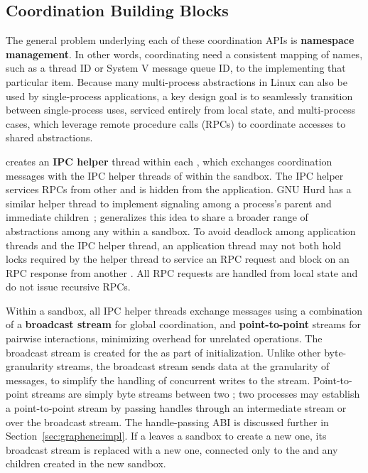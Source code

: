 \subsection{Coordination Building Blocks}
\label{sec:graphene:namespaces:blocks}

The general problem underlying each of these coordination APIs is 
{\bf namespace management}.  In other words, coordinating \picoprocs{} need 
a consistent mapping of names, such as a thread ID or System V message queue ID, 
to the \picoproc{} implementing that particular item.  
Because many multi-process abstractions in Linux can also be used by single-process applications,
a key design goal is to seamlessly transition between single-process uses, serviced 
entirely from local \libos{} state, and multi-process cases, which
leverage remote procedure calls (RPCs) to coordinate accesses to shared abstractions.


\sysname{} creates an  {\bf IPC helper} thread within each \picoproc{},
which exchanges coordination messages with the IPC helper threads of \picoprocs{} 
within the sandbox. %
The IPC helper
services RPCs from other \picoprocs{} and is
hidden from the application. 
GNU Hurd has a similar helper thread to implement signaling among a process's parent and
immediate children~\citep{hurd};
\sysname{} generalizes this idea to share a broader range of abstractions among any \picoprocs{}
within a sandbox.
To avoid deadlock among application threads and the IPC helper thread, 
an application thread may not both hold locks required by the helper thread to service an RPC request
and block
on an RPC response from another \picoproc{}.
All RPC requests are handled from local state and do not issue recursive RPCs.%

Within a sandbox, all IPC helper threads exchange messages using a
combination of a {\bf broadcast stream} for global coordination,
and {\bf point-to-point} streams for pairwise interactions, 
minimizing overhead for unrelated operations.
The broadcast stream is created for the \picoproc{} as part of initialization.
Unlike other byte-granularity streams, the broadcast stream sends data at the granularity of messages,
to simplify the handling of concurrent writes to the stream.
Point-to-point streams are simply byte streams between two \picoprocs{};
two processes may establish a point-to-point stream by passing handles through 
an intermediate stream or over the broadcast stream.
The handle-passing ABI is discussed further in Section~\ref{sec:graphene:impl}.
If a \picoproc{} leaves a sandbox to create a new one,
its broadcast stream is replaced
with a new one, connected only to the \picoproc{} and any children created in the
new sandbox.

